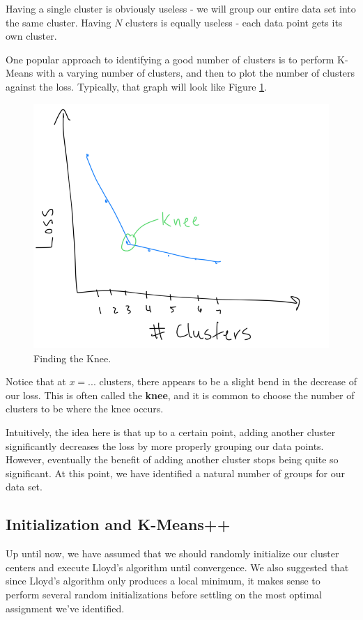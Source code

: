 Having a single cluster is obviously useless - we will group our entire data set into the same cluster. Having $N$ clusters is equally useless - each data point gets its own cluster.

One popular approach to identifying a good number of clusters is to perform K-Means with a varying number of clusters, and then to plot the number of clusters against the loss. Typically, that graph will look like Figure \ref{fig:knee}.

\begin{figure}
    \centering
    \includegraphics[width=0.5\paperwidth]{../Clustering/fig/knee.png}
    \caption{Finding the Knee.}
    \label{fig:knee}
\end{figure}

Notice that at $x=...$ clusters, there appears to be a slight bend in the decrease of our loss. This is often called the \textbf{knee}, and it is common to choose the number of clusters to be where the knee occurs.

Intuitively, the idea here is that up to a certain point, adding another cluster significantly decreases the loss by more properly grouping our data points. However, eventually the benefit of adding another cluster stops being quite so significant. At this point, we have identified a natural number of groups for our data set.

\subsection{Initialization and K-Means++}
Up until now, we have assumed that we should randomly initialize our cluster centers and execute Lloyd's algorithm until convergence. We also suggested that since Lloyd's algorithm only produces a local minimum, it makes sense to perform several random initializations before settling on the most optimal assignment we've identified.

